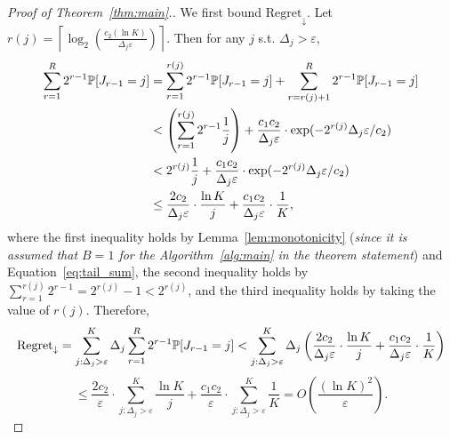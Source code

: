 \begin{proof}[Proof of Theorem~\ref{thm:main}.]
	
We first bound $\text{Regret}_{\downarrow}$. Let $r(j) = \left\lceil \log_2\left( \frac{c_2(\ln K)}{\Delta_j\varepsilon}\right) \right\rceil$. Then for any $j$ s.t. $\Delta_j > \varepsilon$,
\begin{align*}
\sum_{r=1}^{R} 2^{r-1}\mathbb{P}[J_{r-1} = j]
&=\sum_{r=1}^{r(j)} 2^{r-1}\mathbb{P}[J_{r-1} = j] +\sum_{r=r(j)+1}^{R} 2^{r-1}\mathbb{P}[J_{r-1} = j]\\
&< \left(\sum_{r=1}^{r(j)} 2^{r-1}\frac{1}{j}\right) + \frac{c_1c_2}{\Delta_j \varepsilon}\cdot \exp(-2^{r(j)}\Delta_j \varepsilon / c_2)\\
&< 2^{r(j)}\frac{1}{j} + \frac{c_1c_2}{\Delta_j \varepsilon}\cdot \exp(-2^{r(j)}\Delta_j \varepsilon / c_2)\\
&\leq \frac{2 c_2}{\Delta_j \varepsilon}\cdot \frac{\ln K}{j} + \frac{c_1c_2}{\Delta_j \varepsilon}\cdot \frac{1}{K},
\end{align*}
where the first inequality holds by Lemma~\ref{lem:monotonicity} (\emph{since it is assumed that $B=1$ for the Algorithm~\ref{alg:main} in the theorem statement}) and Equation~\ref{eq:tail_sum}, the second inequality holds by $\sum_{r=1}^{r(j)} 2^{r-1} = 2^{r(j)}-1 < 2^{r(j)}$, and the third inequality holds by taking the value of $r(j)$.
Therefore,
$$
\text{Regret}_{\downarrow} = \sum_{j:\Delta_j > \varepsilon}^{K}\Delta_{j}\sum_{r=1}^{R} 2^{r-1}\mathbb{P}[J_{r-1} = j] < \sum_{j:\Delta_j > \varepsilon}^{K}\Delta_{j}\left(\frac{2 c_2}{\Delta_j \varepsilon}\cdot \frac{\ln K}{j} + \frac{c_1c_2}{\Delta_j \varepsilon}\cdot \frac{1}{K}\right)
$$
$$
\leq  \frac{2 c_2}{\varepsilon}\cdot \sum_{j:\Delta_j > \varepsilon}^{K}\frac{\ln K}{j} + \frac{c_1c_2}{\varepsilon}\cdot \sum_{j:\Delta_j > \varepsilon}^{K}\frac{1}{K} = O\left( \frac{(\ln K)^2}{\varepsilon} \right).
$$
	

\end{proof}
